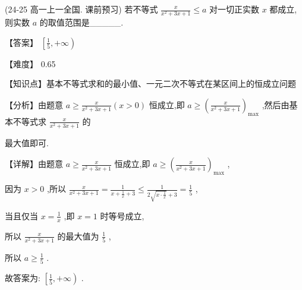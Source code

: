 \documentclass[11pt,a4paper]{article}
\begin{document}
\begin{hmwk} 
 (24-25 高一上一全国. 课前预习) 若不等式 \(\displaystyle \frac{x}{{x}^{2} + {3x} + 1} \leq  a\) 对一切正实数 \(\displaystyle x\) 都成立,则实数 \(\displaystyle a\) 的取值范围是\_\_\_\_\_.

\begin{jiexi}
【答案】 \(\displaystyle \left\lbrack  {\frac{1}{5}, + \infty }\right)\)

【难度】 0.65

【知识点】基本不等式求和的最小值、一元二次不等式在某区间上的恒成立问题

【分析】由题意 \(\displaystyle a \geq  \frac{x}{{x}^{2} + {3x} + 1}\left( {x > 0}\right)\) 恒成立,即 \(\displaystyle a \geq  {\left( \frac{x}{{x}^{2} + {3x} + 1}\right) }_{\max }\) ,然后由基本不等式求 \(\displaystyle \frac{x}{{x}^{2} + {3x} + 1}\) 的

最大值即可.

【详解】由题意 \(\displaystyle a \geq  \frac{x}{{x}^{2} + {3x} + 1}\) 恒成立,即 \(\displaystyle a \geq  {\left( \frac{x}{{x}^{2} + {3x} + 1}\right) }_{\max }\) ,

因为 \(\displaystyle x > 0\) ,所以 \(\displaystyle \frac{x}{{x}^{2} + {3x} + 1} = \frac{1}{x + \frac{1}{x} + 3} \leq  \frac{1}{2\sqrt{x \cdot  \frac{1}{x}} + 3} = \frac{1}{5}\) ,

当且仅当 \(\displaystyle x = \frac{1}{x}\) ,即 \(\displaystyle x = 1\) 时等号成立,

所以 \(\displaystyle \frac{x}{{x}^{2} + {3x} + 1}\) 的最大值为 \(\displaystyle \frac{1}{5}\) ,

所以 \(\displaystyle a \geq  \frac{1}{5}\) .

故答案为: \(\displaystyle \left\lbrack  {\frac{1}{5}, + \infty }\right)\) .

\end{jiexi}
\end{hmwk}
\end{document}
